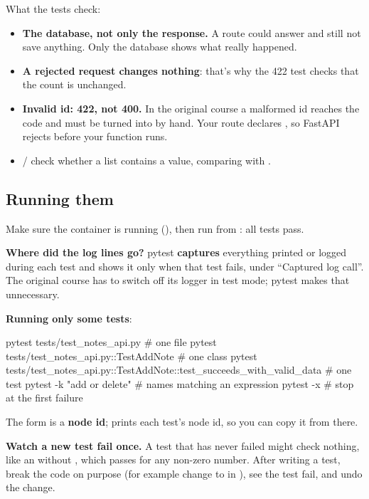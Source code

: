 What the tests check:
\begin{itemize}
\item \textbf{The database, not only the response.} A route could answer  and still not save anything. Only the database shows what really happened.
\item \textbf{A rejected request changes nothing}: that's why the 422 test checks that the count is unchanged.
\item \textbf{Invalid id: 422, not 400.} In the original course a malformed id reaches the code and must be turned into  by hand. Your route declares , so FastAPI rejects  before your function runs.
\item {} /  check whether a list contains a value, comparing with \cd{==}.
\end{itemize}

\subsection{Running them}

Make sure the container is running (), then run  from : all tests pass.

\textbf{Where did the log lines go?} pytest \textbf{captures} everything printed or logged during each test and shows it only when that test fails, under ``Captured log call''. The original course has to switch off its logger in test mode; pytest makes that unnecessary.

\textbf{Running only some tests}:

\begin{code}
pytest tests/test_notes_api.py                                              # one file
pytest tests/test_notes_api.py::TestAddNote                                 # one class
pytest tests/test_notes_api.py::TestAddNote::test_succeeds_with_valid_data  # one test
pytest -k "add or delete"                                                   # names matching an expression
pytest -x                                                                   # stop at the first failure
\end{code}

The  form is a \textbf{node id};  prints each test's node id, so you can copy it from there.

\textbf{Watch a new test fail once.} A test that has never failed might check nothing, like an  without \cd{==}, which passes for any non-zero number. After writing a test, break the code on purpose (for example change  to  in ), see the test fail, and undo the change.

